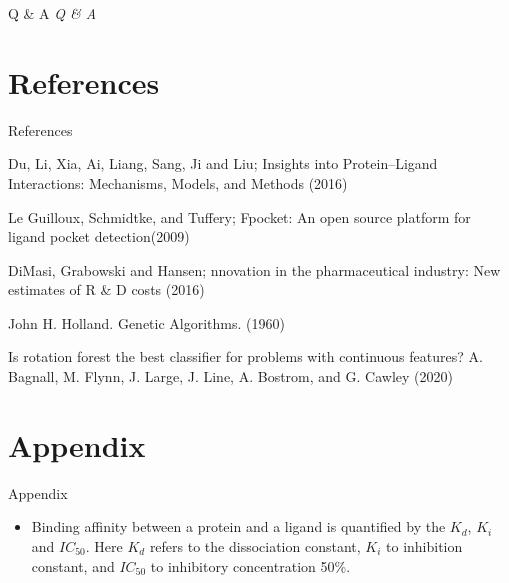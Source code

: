 \documentclass{beamer}
\begin{document}
\begin{frame}[t]{Q \& A}
  \centering \Huge
  \emph{Q \& A}
\end{frame}

\section{References}

\begin{frame}[t]{References}

\begin{thebibliography}{1}

\alert{Du,  Li,  Xia,  Ai,  Liang,  Sang,  Ji and Liu; Insights into Protein–Ligand Interactions: Mechanisms, Models, and Methods (2016)}

\alert{Le Guilloux,  Schmidtke, and Tuffery; Fpocket: An open source platform for ligand pocket detection(2009)}

\alert{DiMasi,  Grabowski and Hansen; nnovation in the pharmaceutical industry: New estimates of R \& D costs (2016)}

\alert{John H. Holland.  Genetic Algorithms. (1960)}

\alert{Is rotation forest the best classifier for problems with continuous features? A. Bagnall, M. Flynn, J. Large, J. Line, A. Bostrom, and G. Cawley (2020)}

\end{thebibliography}

\end{frame}

\section{Appendix}

\begin{frame}[t]{Appendix}

\begin{itemize}
\item Binding affinity between a protein and a ligand is quantified by the $K_d$, $K_i$ and $IC_{50}$.
Here $K_d$ refers to the dissociation constant, $K_i$ to inhibition constant, and $IC_{50}$ to 
inhibitory concentration 50\%.
\end{itemize}
\end{frame}
\end{document}

